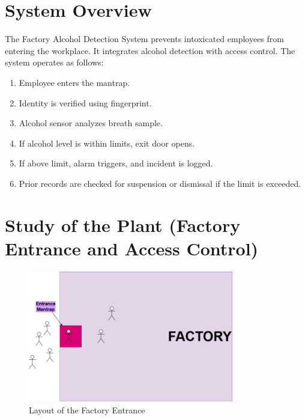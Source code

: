 \documentclass[12pt]{article}
\begin{document}
    
    
    \begingroup
        \hypersetup{linkcolor=black}
        \tableofcontents
        \listoffigures
    \endgroup
    
    \clearpage{}
    
    

    \section{System Overview}
    \label{sec:system_overview}
    The Factory Alcohol Detection System prevents intoxicated employees from entering the workplace. It integrates alcohol detection with access control. The system operates as follows:
    \begin{enumerate}
        \item Employee enters the mantrap.
        \item Identity is verified using fingerprint.
        \item Alcohol sensor\cite{mq3_sensor} analyzes breath sample.
        \item If alcohol level is within limits, exit door opens.
        \item If above limit, alarm triggers, and incident is logged.
        \item Prior records are checked for suspension or dismissal if the limit is exceeded.
    \end{enumerate}

    \section{Study of the Plant (Factory Entrance and Access Control)}
    \label{sec:plant_study}
    
    \begin{figure}[H]
        \centering
        \includegraphics[width=0.8\textwidth]{images/layout.png}
        \caption{Layout of the Factory Entrance}
        \label{fig:entrance_layout}
    \end{figure}
\end{document}
